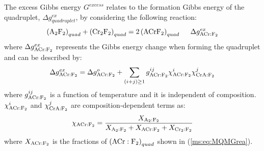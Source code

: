 The excess Gibbs energy $G^{excess}$ relates to the formation Gibbs energy of the quadruplet, $\Delta g_{quadruplet}^{ex}$, by considering the following reaction:
\begin{equation} \label{ms:eq:MQMGrea}
    \left(\rm {A_2F_2}\right)_{quad}+\left({\rm Cr_2F_2}\right)_{quad}=2\left({\rm ACrF_2}\right)_{quad}\;\;\;\;\;\Delta g_{\rm ACr:F_2}^{ex}
\end{equation}
where $\Delta g_{\rm ACr:F_2}^{ex}$ represents the Gibbs energy change when forming the quadruplet and can be described by:
\begin{equation} \label{ms:eq:MQMGex}
    \Delta g_{\rm {ACr:F_2}}^{ex}=\Delta g_{\rm {ACr:F_2}}^o+\sum_{(i+j)\geq1} g_{\rm {ACr:F_2}}^{ij}\chi _{\rm {ACr:F_2}}^{i}\chi _{\rm {CrA:F_2}}^{j}
\end{equation}
where $g_{\rm {ACr:F_2}}^{ij}$ is a function of temperature and it is independent of composition. $\chi _{\rm {ACr:F_2}}^{i}$ and $\chi _{\rm {CrA:F_2}}^{j}$ are composition-dependent terms as:
\begin{equation} \label{ms:eq:chi}
    \chi_{\rm {ACr:F_2}} = \dfrac{X_{\rm {A_2:F_2}}}{X_{\rm {A_2:F_2}}+X_{\rm {ACr:F_2}}+X_{\rm {Cr_2:F_2}}}
\end{equation}
where $X_{\rm{ACr:F_2}}$ is the fractions of $\left(\rm{ACr:F_2}\right)_{quad}$ shown in (\ref{ms:eq:MQMGrea}). 

